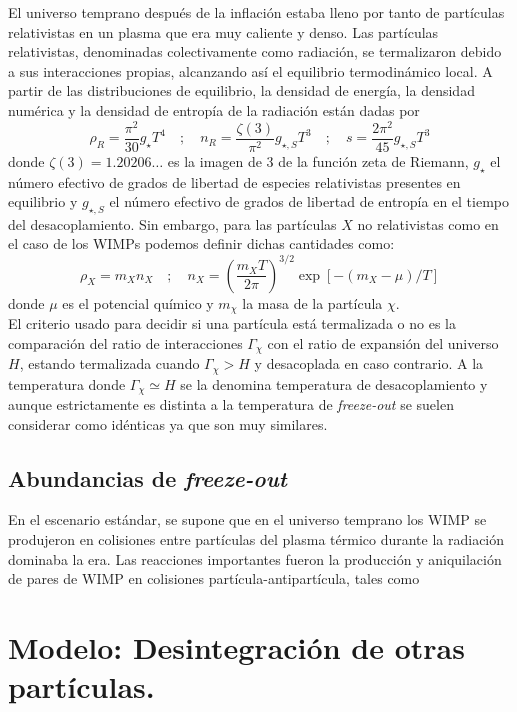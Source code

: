 \documentclass[11pt]{article}
\begin{document}
El universo temprano después de la inflación estaba lleno por tanto de partículas relativistas en un plasma que era muy caliente y denso. Las partículas relativistas, denominadas colectivamente como radiación, se termalizaron debido a sus interacciones propias, alcanzando así el equilibrio termodinámico local. A partir de las distribuciones de equilibrio, la densidad de energía, la densidad numérica y la densidad de entropía de la radiación están dadas por
\begin{equation}
\rho_R=\frac{\pi^2}{30}g_\star T^4\quad ; \quad n_R=\frac{\zeta(3)}{\pi^2}g_{\star,S}T^3\quad ; \quad s=\frac{2\pi^2}{45}g_{\star,S}T^3
\end{equation}
donde $\zeta(3)=1.20206\ldots$ es la imagen de 3 de la función zeta de Riemann, $g_\star$ el número efectivo de grados de libertad de especies relativistas presentes en equilibrio y $g_{\star,S}$ el número efectivo de grados de libertad de entropía en el tiempo del desacoplamiento. Sin embargo, para las partículas $X$ no relativistas como en el caso de los WIMPs podemos definir dichas cantidades como:
\begin{equation}
\rho_X=m_Xn_X\quad ; \quad n_X=\left(\frac{m_X T}{2\pi}\right)^{3/2}\exp\left[-(m_X-\mu)/T\right]
\end{equation}
donde $\mu$ es el potencial químico y $m_\chi$ la masa de la partícula $\chi$.\\

El criterio usado para decidir si una partícula está termalizada o no es la comparación del ratio de interacciones $\Gamma_\chi$ con el ratio de expansión del universo $H$, estando termalizada cuando $\Gamma_\chi>H$ y desacoplada en caso contrario. A la temperatura donde $\Gamma_\chi\simeq H$ se la denomina temperatura de desacoplamiento y aunque estrictamente es distinta a la temperatura de \textit{freeze-out} se suelen considerar como idénticas ya que son muy similares.

\subsection{Abundancias de \textit{freeze-out}}
En el escenario estándar, se supone que en el universo temprano los WIMP se produjeron en colisiones entre partículas del plasma térmico durante la radiación dominaba la era. Las reacciones importantes fueron la producción y aniquilación de pares de WIMP en colisiones partícula-antipartícula, tales como

\section{Modelo: Desintegración de otras partículas.}
\end{document}
